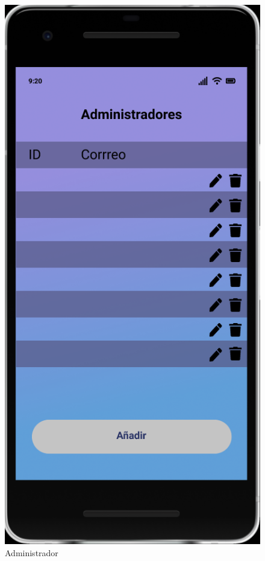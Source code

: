 \documentclass{article}
\begin{document}
\begin{figure}[H]
    \centering
    \includegraphics[scale=0.9]{imgs/Figma/Admins}
    \caption{Administrador}
\end{figure}
\end{document}
